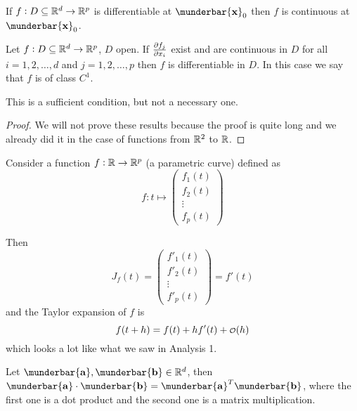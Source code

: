 \documentclass[14pt]{extarticle}
\renewcommand{\vec}[1]{\munderbar{\mathbf{#1}}}
\begin{document}
\begin{proposition}
    If $f: D \subseteq \mathbb{R}^d \to \mathbb{R}^p$ is differentiable at $\vec{x}_0$ then $f$ is continuous at $\vec{x}_0$.
\end{proposition}

\begin{theorem}
    Let $f: D \subseteq \mathbb{R}^d \to \mathbb{R}^p$, $D$ open. If $\pdv{f_j}{x_i}()$ exist and are continuous in $D$ for all $i = 1, 2, \ldots, d$ and $j = 1, 2, \ldots, p$ then $f$ is differentiable in $D$.
    In this case we say that $f$ is of class $C^1$.
\end{theorem}
\begin{remark}
    This is a sufficient condition, but not a necessary one.
\end{remark}

\begin{proof}
    We will not prove these results because the proof is quite long and we already did it in the case of functions from $\mathbb{R}^2$ to $\mathbb{R}$.
\end{proof}

\begin{example}
    Consider a function $f: \mathbb{R} \to \mathbb{R}^p$ (a parametric curve) defined as
    \begin{equation}
        f : t \mapsto \begin{pmatrix}
            f_1(t) \\
            f_2(t) \\
            \vdots \\
            f_p(t)
        \end{pmatrix}
    \end{equation}

    Then
    \begin{equation}
        J_f(t) = \begin{pmatrix}
            f'_1(t) \\
            f'_2(t) \\
            \vdots  \\
            f'_p(t)
        \end{pmatrix} = f'(t)
    \end{equation}
    and the Taylor expansion of $f$ is
    \begin{equation}
        f(t + h) = f(t) + h f'(t) + \o(h)
    \end{equation}
    which looks a lot like what we saw in Analysis 1.
\end{example}
\begin{remark}
    Let $\vec{a}, \vec{b} \in \R^d$, then $\vec{a} \cdot \vec{b} = \vec{a}^T \vec{b}$, where the first one is a dot product and the second one is a matrix multiplication.
\end{remark}
\end{document}
